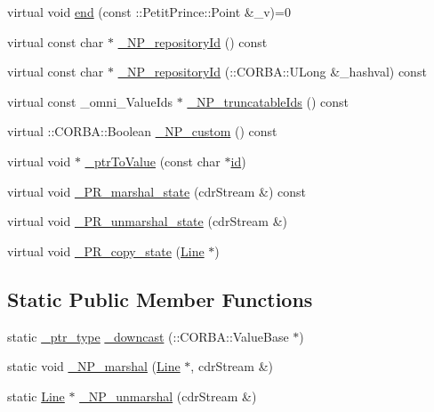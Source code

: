 \begin{DoxyCompactItemize}
\item 
virtual void \hyperlink{class_line_a422da36ea2f877b1c30d0bff5153a707}{end} (const \+::Petit\+Prince\+::\+Point \&\+\_\+v)=0
\item 
virtual const char $\ast$ \hyperlink{class_line_a5aa5a1667a431543c7d5f5c5aa392962}{\+\_\+\+N\+P\+\_\+repository\+Id} () const 
\item 
virtual const char $\ast$ \hyperlink{class_line_a12ea7527d761f37cfe908fbcabab7ca7}{\+\_\+\+N\+P\+\_\+repository\+Id} (\+::C\+O\+R\+B\+A\+::\+U\+Long \&\+\_\+hashval) const 
\item 
virtual const \+\_\+omni\+\_\+\+Value\+Ids $\ast$ \hyperlink{class_line_a35a312efa270e82c4c038e90aa6e676e}{\+\_\+\+N\+P\+\_\+truncatable\+Ids} () const 
\item 
virtual \+::C\+O\+R\+B\+A\+::\+Boolean \hyperlink{class_line_a694798a7c10a1140fe76cfd7c5563594}{\+\_\+\+N\+P\+\_\+custom} () const 
\item 
virtual void $\ast$ \hyperlink{class_line_a569c01e17ca50a4b7d6bd7d80553040d}{\+\_\+ptr\+To\+Value} (const char $\ast$\hyperlink{class_draw_a1bf27c5a59da9002d55936c947dce2cc}{id})
\item 
virtual void \hyperlink{class_line_a17a35e84f5dd3ff6ecfa3df14f02dc10}{\+\_\+\+P\+R\+\_\+marshal\+\_\+state} (cdr\+Stream \&) const 
\item 
virtual void \hyperlink{class_line_a001d93972f80167f1b53d728a55afef9}{\+\_\+\+P\+R\+\_\+unmarshal\+\_\+state} (cdr\+Stream \&)
\item 
virtual void \hyperlink{class_line_a1b19ca8c4ce07cd365d189215f12c62f}{\+\_\+\+P\+R\+\_\+copy\+\_\+state} (\hyperlink{class_line}{Line} $\ast$)
\end{DoxyCompactItemize}
\subsection*{Static Public Member Functions}
\begin{DoxyCompactItemize}
\item 
static \hyperlink{class_draw_a5164256572b3c4123ceecd1897c248dd}{\+\_\+ptr\+\_\+type} \hyperlink{class_line_afa65669cf372e878732863fd66902d1d}{\+\_\+downcast} (\+::C\+O\+R\+B\+A\+::\+Value\+Base $\ast$)
\item 
static void \hyperlink{class_line_ae2475a529c9b0ed1f7eb9ca396b35999}{\+\_\+\+N\+P\+\_\+marshal} (\hyperlink{class_line}{Line} $\ast$, cdr\+Stream \&)
\item 
static \hyperlink{class_line}{Line} $\ast$ \hyperlink{class_line_a81748df80cd480d249f192c649df8e1e}{\+\_\+\+N\+P\+\_\+unmarshal} (cdr\+Stream \&)
\end{DoxyCompactItemize}
